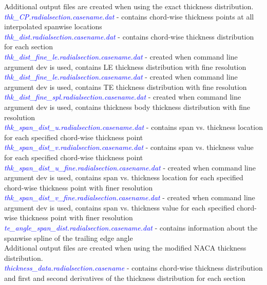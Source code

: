 \documentclass[8pt]{article}
\begin{document}
\noindent
Additional output files are created when using the exact thickness distribution.\\
\noindent
\textit{\textcolor{blue}{thk\_CP.radialsection.casename.dat}} - contains chord-wise thickness points at all interpolated spanwise locations\\
\textit{\textcolor{blue}{thk\_dist.radialsection.casename.dat}} - contains chord-wise thickness distribution for each section\\
\textit{\textcolor{blue}{thk\_dist\_fine\_le.radialsection.casename.dat}} - created when command line argument {\selectfont dev} is used, contains LE thickness distribution with fine resolution\\
\textit{\textcolor{blue}{thk\_dist\_fine\_le.radialsection.casename.dat}} - created when command line argument {\selectfont dev} is used, contains TE thickness distribution with fine resolution\\
\textit{\textcolor{blue}{thk\_dist\_fine\_spl.radialsection.casename.dat}} - created when command line argument {\selectfont dev} is used, contains thickness body thickness distribution with fine resolution\\
\textit{\textcolor{blue}{thk\_span\_dist\_u.radialsection.casename.dat}} - contains span vs. thickness location for each specified chord-wise thickness point\\
\textit{\textcolor{blue}{thk\_span\_dist\_v.radialsection.casename.dat}} - contains span vs. thickness value for each specified chord-wise thickness point\\
\textit{\textcolor{blue}{thk\_span\_dist\_u\_fine.radialsection.casename.dat}} - created when command line argument {\selectfont dev} is used, contains span vs. thickness location for each specified chord-wise thickness point with finer resolution\\
\textit{\textcolor{blue}{thk\_span\_dist\_v\_fine.radialsection.casename.dat}} - created when command line argument {\selectfont dev} is used, contains span vs. thickness value for each specified chord-wise thickness point with finer resolution\\
\textit{\textcolor{blue}{te\_angle\_span\_dist.radialsection.casename.dat}} - contains information about the spanwise spline of the trailing edge angle\\

\noindent
Additional output files are created when using the modified NACA thickness distribution.\\
\noindent
\textit{\textcolor{blue}{thickness\_data.radialsection.casename}} - contains chord-wise thickness distribution and first and second derivatives of the thickness distribution for each section
\end{document}
